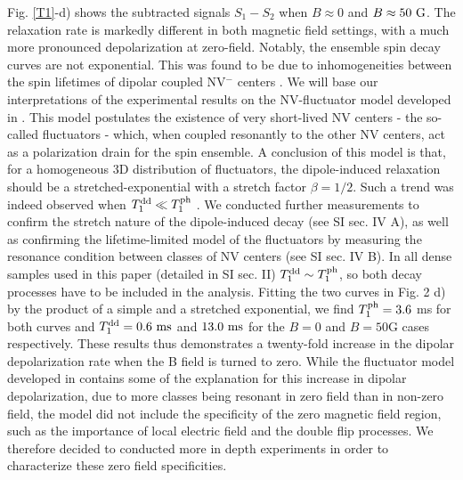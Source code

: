 \documentclass[preprintnumbers,amsmath,amssymb,superscriptaddress,twocolumn,showpacs]{revtex4-2}
\begin{document}
Fig. \ref{T1}-d) shows the subtracted signals $S_1-S_2$ when $B\approx 0$ and $B \approx 50\ \rm G$.
The relaxation rate is markedly different in both magnetic field settings, with a much more pronounced depolarization at zero-field.
Notably, the ensemble spin decay curves are not exponential. This was found to be due to inhomogeneities between the spin lifetimes of dipolar coupled NV$^-$ centers \citep{choi2017depolarization}.
We will base our interpretations of the experimental results on the NV-fluctuator model developed in \citep{choi2017depolarization}. This model postulates the existence of very short-lived NV centers - the so-called fluctuators - which, when coupled resonantly to the other NV centers, act as a polarization drain for the spin ensemble. A conclusion of this model is that, for a homogeneous 3D distribution of fluctuators, the dipole-induced relaxation should be a stretched-exponential with a stretch factor $\beta=1/2$. Such a trend was indeed observed when $T_1^{\rm dd} \ll T_1^{\rm ph}$ \cite{choi2017depolarization}. We conducted further measurements to confirm the stretch nature of the dipole-induced decay (see SI sec. IV A), as well as confirming the lifetime-limited model of the fluctuators by measuring the resonance condition between classes of NV centers (see SI sec. IV B).
In all dense samples used in this paper (detailed in SI sec. II) $T_1^{\rm dd} \sim T_1^{\rm ph}$, so both decay processes have to be included in the analysis. Fitting the two curves in Fig. 2 d) by the product of a simple and a stretched exponential, we find $T_1^{\rm ph}=3.6$ ms for both curves and $T_1^{\rm dd}= 0.6\ \rm ms$ and $13.0\ \rm ms$ for the $B=0$ and $B=50$G cases respectively. These results thus demonstrates a twenty-fold increase in the dipolar depolarization rate when the B field is turned to zero.
While the fluctuator model developed in \citep{choi2017depolarization} contains some of the explanation for this increase in dipolar depolarization, due to more classes being resonant in zero field than in non-zero field, the model did not include the specificity of the zero magnetic field region, such as the importance of local electric field and the double flip processes. We therefore decided to conducted more in depth experiments in order to characterize these zero field specificities.
\end{document}
